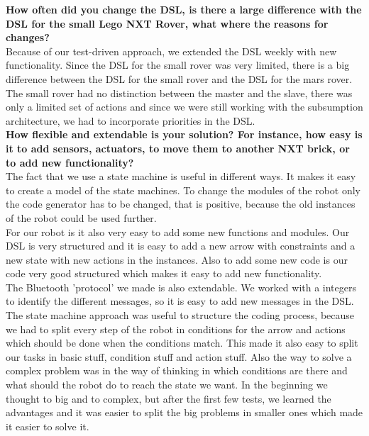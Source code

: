 \documentclass[11pt,a4paper]{article}
\begin{document}
\textbf{How often did you change the DSL, is there a large difference with the DSL for the small Lego NXT Rover, what where the reasons for changes?}\\
Because of our test-driven approach, we extended the DSL weekly with new functionality. Since the DSL for the small rover was very limited, there is a big difference between the DSL for the small rover and the DSL for the mars rover. The small rover had no distinction between the master and the slave, there was only a limited set of actions and since we were still working with the subsumption architecture, we had to incorporate priorities in the DSL.\\

\textbf{How flexible and extendable is your solution? For instance, how easy is it to add sensors, actuators, to move them to another NXT brick, or to add new functionality?}\\
The fact that we use a state machine is useful in different ways. It makes it easy to create a model of the state machines. To change the modules of the robot only the code generator has to be changed, that is positive, because the old instances of the robot could be used further. \\
For our robot is it also very easy to add some new functions and modules. Our DSL is very structured and it is easy to add a new arrow with constraints and a new state with new actions in the instances. Also to add some new code is our code very good structured which makes it easy to add new functionality. \\
The Bluetooth 'protocol' we made is also extendable. We worked with a integers to identify the different messages, so it is easy to add new messages in the DSL. \\
The state machine approach was useful to structure the coding process, because we had to split every step of the robot in conditions for the arrow and actions which should be done when the conditions match. This made it also easy to split our tasks in basic stuff, condition stuff and action stuff. Also the way to solve a complex problem was in the way of thinking in which conditions are there and what should the robot do to reach the state we want. In the beginning we thought to big and to complex, but after the first few tests, we learned the advantages and it was easier to split the big problems in smaller ones which made it easier to solve it. \\
\end{document}
